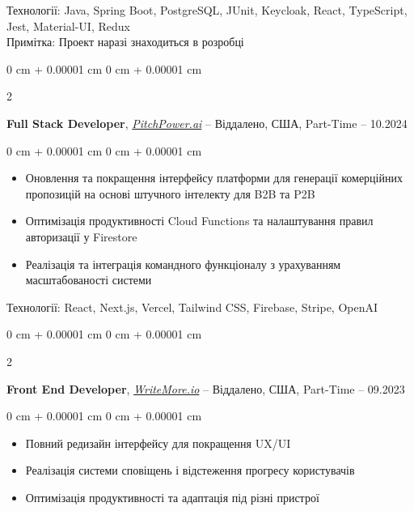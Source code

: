 \documentclass[10pt, letterpaper]{article}
\newenvironment{highlights}{
    \begin{itemize}[
        topsep=0.10 cm,
        parsep=0.10 cm,
        partopsep=0pt,
        itemsep=0pt,
        leftmargin=0 cm + 10pt
    ]
}{
    \end{itemize}
} %
\newenvironment{onecolentry}{
    \begin{adjustwidth}{
        0 cm + 0.00001 cm
    }{
        0 cm + 0.00001 cm
    }
}{
    \end{adjustwidth}
} %
\newenvironment{twocolentry}[2][]{
    \onecolentry
    \def\secondColumn{#2}
    \setcolumnwidth{\fill, 4.5 cm}
    \begin{paracol}{2}
}{
    \switchcolumn \raggedleft \secondColumn
    \end{paracol}
    \endonecolentry
} %
\let\hrefWithoutArrow\href
\begin{document}
    \vspace{0.2 cm}
    Технології: Java, Spring Boot, PostgreSQL, JUnit, Keycloak, React, TypeScript, Jest, Material-UI, Redux \\
    \vspace{0.1 cm}
    Примітка: Проект наразі знаходиться в розробці

    \vspace{0.3 cm}
    
    \begin{twocolentry}{
        06.2024 – 10.2024
    }
        \textbf{Full Stack Developer}, \hrefWithoutArrow{https://pitchpower.ai/}{\textit{PitchPower.ai}} -- Віддалено, США, Part-Time\end{twocolentry}

    \vspace{0.20 cm}

    \begin{onecolentry}
        \begin{highlights}
            \item Оновлення та покращення інтерфейсу платформи для генерації комерційних пропозицій на основі штучного інтелекту для B2B та P2B
            \item Оптимізація продуктивності Cloud Functions та налаштування правил авторизації у Firestore
            \item Реалізація та інтеграція командного функціоналу з урахуванням масштабованості системи
        \end{highlights}
    \end{onecolentry}

    \vspace{0.20 cm}
    Технології: React, Next.js, Vercel, Tailwind CSS, Firebase, Stripe, OpenAI

    \vspace{0.3 cm}
    
    \begin{twocolentry}{
        05.2023 – 09.2023
    }
        \textbf{Front End Developer}, \hrefWithoutArrow{https://writemore.io/}{\textit{WriteMore.io}} -- Віддалено, США, Part-Time\end{twocolentry}

    \vspace{0.20 cm}

    \begin{onecolentry}
        \begin{highlights}
            \item Повний редизайн інтерфейсу для покращення UX/UI
            \item Реалізація системи сповіщень і відстеження прогресу користувачів
            \item Оптимізація продуктивності та адаптація під різні пристрої
        \end{highlights}
    \end{onecolentry}
\end{document}

